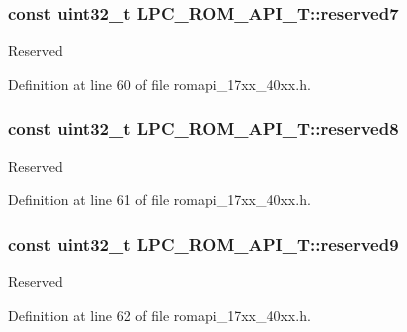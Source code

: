 \subsubsection[{\texorpdfstring{reserved7}{reserved7}}]{\setlength{\rightskip}{0pt plus 5cm}const uint32\+\_\+t L\+P\+C\+\_\+\+R\+O\+M\+\_\+\+A\+P\+I\+\_\+\+T\+::reserved7}\hypertarget{structLPC__ROM__API__T_a7a9d7f0aa59c70ff085c59291594d22c}{}\label{structLPC__ROM__API__T_a7a9d7f0aa59c70ff085c59291594d22c}
Reserved 

Definition at line 60 of file romapi\+\_\+17xx\+\_\+40xx.\+h.

\subsubsection[{\texorpdfstring{reserved8}{reserved8}}]{\setlength{\rightskip}{0pt plus 5cm}const uint32\+\_\+t L\+P\+C\+\_\+\+R\+O\+M\+\_\+\+A\+P\+I\+\_\+\+T\+::reserved8}\hypertarget{structLPC__ROM__API__T_a81674fc569de19c3dd861c1f87df1d44}{}\label{structLPC__ROM__API__T_a81674fc569de19c3dd861c1f87df1d44}
Reserved 

Definition at line 61 of file romapi\+\_\+17xx\+\_\+40xx.\+h.

\subsubsection[{\texorpdfstring{reserved9}{reserved9}}]{\setlength{\rightskip}{0pt plus 5cm}const uint32\+\_\+t L\+P\+C\+\_\+\+R\+O\+M\+\_\+\+A\+P\+I\+\_\+\+T\+::reserved9}\hypertarget{structLPC__ROM__API__T_aae524e6f969485072d45b577c7501abc}{}\label{structLPC__ROM__API__T_aae524e6f969485072d45b577c7501abc}
Reserved 

Definition at line 62 of file romapi\+\_\+17xx\+\_\+40xx.\+h.

